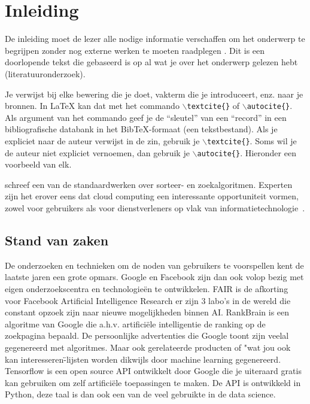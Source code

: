 
\chapter{Inleiding}
\label{ch:inleiding}

De inleiding moet de lezer alle nodige informatie verschaffen om het onderwerp te begrijpen zonder nog externe werken te moeten raadplegen \autocite{Pollefliet2011}. Dit is een doorlopende tekst die gebaseerd is op al wat je over het onderwerp gelezen hebt (literatuuronderzoek).

Je verwijst bij elke bewering die je doet, vakterm die je introduceert, enz. naar je bronnen. In \LaTeX{} kan dat met het commando \texttt{$\backslash${textcite\{\}}} of \texttt{$\backslash${autocite\{\}}}. Als argument van het commando geef je de ``sleutel'' van een ``record'' in een bibliografische databank in het Bib\TeX{}-formaat (een tekstbestand). Als je expliciet naar de auteur verwijst in de zin, gebruik je \texttt{$\backslash${}textcite\{\}}.
Soms wil je de auteur niet expliciet vernoemen, dan gebruik je \texttt{$\backslash${}autocite\{\}}. Hieronder een voorbeeld van elk.

\textcite{Knuth1998} schreef een van de standaardwerken over sorteer- en zoekalgoritmen. Experten zijn het erover eens dat cloud computing een interessante opportuniteit vormen, zowel voor gebruikers als voor dienstverleners op vlak van informatietechnologie~\autocite{Creeger2009}.

\section{Stand van zaken}
\label{sec:stand-van-zaken}



De onderzoeken en technieken om de noden van gebruikers te voorspellen kent de laatste jaren een grote opmars. Google en Facebook zijn dan ook volop bezig met eigen onderzoekscentra en technologieën te ontwikkelen. FAIR is de afkorting voor Facebook Artificial Intelligence Research er zijn 3 labo's in de wereld die constant opzoek zijn naar nieuwe mogelijkheden binnen AI. RankBrain is een algoritme van Google die a.h.v. artificiële intelligentie de ranking op de zoekpagina bepaald.
De persoonlijke advertenties die Google toont zijn veelal gegenereerd met algoritmes.  Maar ook gerelateerde producten of "wat jou ook kan interesseren\"-lijsten worden dikwijls door machine learning gegenereerd. Tensorflow \autocite{tensorflow} is een open source API ontwikkelt door Google die je uiteraard gratis kan gebruiken om zelf artificiële toepassingen te maken. De API is ontwikkeld in Python, deze taal is dan ook een van de veel gebruikte in de data science.

